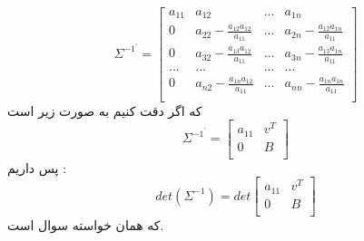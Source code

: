 \[
    {\Sigma^{-1^{\prime}}} = \begin{bmatrix}
    a_{11} & a_{12} & ... & a_{1n} \\
    0      & a_{22} -  \frac{a_{12}a_{12}}{a_{11}}& ... & a_{2n} - \frac{a_{12}a_{1n}}{a_{11}}\\
    0      & a_{32} - \frac{a_{13}a_{12}}{a_{11}} & ... & a_{3n} - \frac{a_{13}a_{1n}}{a_{11}}\\
    ... & ... & ... & ... \\
    0      & a_{n2}- \frac{a_{1n}a_{12}}{a_{11}} & ... & a_{nn}- \frac{a_{1n}a_{1n}}{a_{11}} \\
\end{bmatrix}
\]
که اگر دقت کنیم به صورت زیر است
\[ 
    {\Sigma^{-1^{\prime}}} = \begin{bmatrix}
        a_{11} & v^{T} \\
        0 & B \\
    \end{bmatrix}
\]
پس داریم :\\
\[ det(\Sigma^{-1}) = det \begin{bmatrix}
    a_{11} & v^{T} \\
    0 & B \\
\end{bmatrix}
\]
که همان خواسته سوال است.
\parte{}
